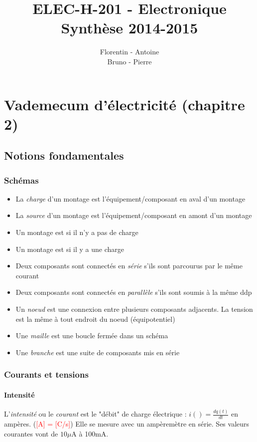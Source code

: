 \documentclass[a4paper]{article}
\title{
    ELEC-H-201 - Electronique\\
    \small Synthèse 2014-2015
}
\author{Florentin \bsc{Hennecker} - Antoine \bsc{Carpentier}\\
Bruno \bsc{Rocha Pereira} - Pierre \bsc{Gérard}}
\date{}
\begin{document}
\maketitle
\tableofcontents

\section{Vademecum d'électricité (chapitre 2)}

    \subsection{Notions fondamentales}

    \subsubsection{Schémas}
    \begin{itemize}
        \item La \textit{charge} d'un montage est l'équipement/composant en aval d'un montage
        \item La \textit{source} d'un montage est l'équipement/composant en amont d'un montage
        \item Un montage est  si il n'y a pas de charge
        \item Un montage est  si il y a une charge
        \item Deux composants sont connectés en \textit{série} s'ils sont parcourus par le même courant
        \item Deux composants sont connectés en \textit{parallèle} s'ils sont soumis à la même ddp
        \item Un \textit{noeud} est une connexion entre plusieurs composants adjacents. La tension est la même à tout endroit du noeud (équipotentiel)
        \item Une \textit{maille} est une boucle fermée dans un schéma
        \item Une \textit{branche} est une suite de composants mis en série
    \end{itemize}

    \subsubsection{Courants et tensions}

    \paragraph{Intensité} L'\textit{intensité} ou le \textit{courant} 
    est le "débit" de charge électrique : $i() = \frac{dq(t)}{dt}$ en ampères. 
    (\textcolor{red}{[A] = [C/s]}) Elle se mesure avec un ampèremètre en série.
    Ses valeurs courantes vont de $10\mu$A à 100mA.\\
\end{document}

